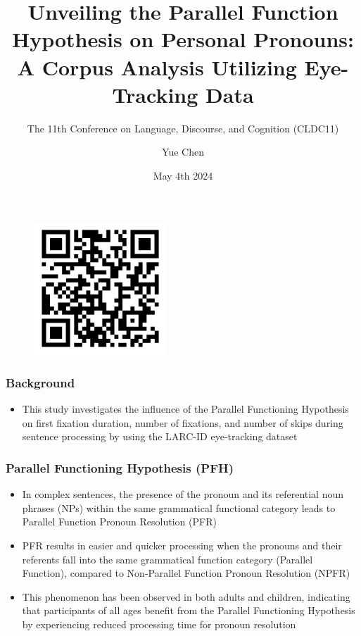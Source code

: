 \documentclass{beamer}
\title{Unveiling the Parallel Function Hypothesis on Personal Pronouns: A Corpus Analysis Utilizing Eye-Tracking Data}
\author{Yue Chen}
\institute{University of California, Los Angeles}
\subtitle{The 11th Conference on Language, Discourse, and Cognition (CLDC11)}
\date{May 4th 2024}
\begin{document}
\frame{\titlepage}

\begin{frame}
\begin{figure}
    \centering
\includegraphics[width=5cm,keepaspectratio]{figures/qr-code.png}
\end{figure}
\end{frame}


\begin{frame}
\frametitle{Background}
\begin{itemize}
\item This study investigates the influence of the Parallel Functioning Hypothesis on first fixation duration, number of fixations, and number of skips during sentence processing by using the LARC-ID eye-tracking dataset \cite{harris2021angeles}
\end{itemize}
\end{frame}


\begin{frame}
\frametitle{Parallel Functioning Hypothesis (PFH)}
\begin{itemize}
    \item In complex sentences, the presence of the pronoun and its referential noun phrases (NPs) within the same grammatical functional category leads to Parallel Function Pronoun Resolution (PFR) \cite{sheldon1974role}\cite{grober1978parallel}
    \item PFR results in easier and quicker processing when the pronouns and their referents fall into the same grammatical function category (Parallel Function), compared to Non-Parallel Function Pronoun Resolution (NPFR) \cite{cinkara2015parallel}\cite{sheldon1974role}\cite{grober1978parallel}
    \item This phenomenon has been observed in both adults and children, indicating that participants of all ages benefit from the Parallel Functioning Hypothesis by experiencing reduced processing time for pronoun resolution \cite{arnold2015effects}\cite{chien1990children}
\end{itemize}
\end{frame}
\end{document}
